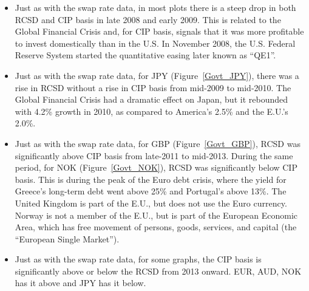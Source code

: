 \begin{itemize}
\item Just as with the swap rate data, in most plots there is a steep drop in both RCSD and CIP basis in late 2008 and early 2009.  This is related to the Global Financial Crisis and, for CIP basis, signals that it was more profitable to invest domestically than in the U.S\@.  In November 2008, the U.S. Federal Reserve System started the quantitative easing later known as ``QE1''.  

\item Just as with the swap rate data, for JPY (Figure~\ref{Govt_JPY}), there was a rise in RCSD without a rise in CIP basis from mid-2009 to mid-2010.  The Global Financial Crisis had a dramatic effect on Japan, but it rebounded with 4.2\% growth in 2010, as compared to America's 2.5\% and the E.U.'s 2.0\%. 

\item Just as with the swap rate data, for GBP (Figure~\ref{Govt_GBP}), RCSD was significantly above CIP basis from late-2011 to mid-2013.  During the same period, for NOK (Figure~\ref{Govt_NOK}), RCSD was significantly below CIP basis.  This is during the peak of the Euro debt crisis, where the yield for Greece's long-term debt went above 25\% and Portugal's above 13\%.  The United Kingdom is part of the E.U., but does not use the Euro currency.  Norway is not a member of the E.U., but is part of the European Economic Area, which has free movement of persons, goods, services, and capital (the ``European Single Market'').  

\item Just as with the swap rate data, for some graphs, the CIP basis is significantly above or below the RCSD from 2013 onward.  EUR, AUD, NOK has it above and JPY has it below.

\end{itemize}






